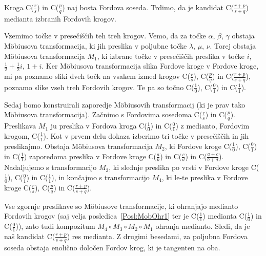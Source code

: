\documentclass[mat1]{fmfdelo}
\begin{document}
\begin{dokaz}
Kroga C($\frac{r}{s}$) in C($\frac{p}{q}$) naj bosta Fordova soseda. Trdimo, da je kandidat C($\frac{r+p}{s+q}$) medianta izbranih Fordovih krogov.

Vzemimo točke v presečiščih teh treh krogov. Vemo, da za točke $\alpha$, $\beta$, $\gamma$ obstaja M\"{o}biusova transformacija, ki jih preslika v poljubne točke $\lambda$, $\mu$, $\nu$. Torej obstaja M\"{o}biusova transformacija $M_{1}$, ki izbrane točke v presečiščih preslika v točke $i$, $\frac{1}{2}+\frac{1}{2}i$, $1+i$. Ker M\"{o}biusova transformacija slika Fordove kroge v Fordove kroge, mi pa poznamo sliki dveh točk na vsakem izmed krogov C($\frac{r}{s}$), C($\frac{p}{q}$) in C($\frac{r+p}{s+q}$), poznamo slike vseh treh Fordovih krogov. Te pa so točno C($\frac{1}{0}$), C($\frac{0}{1}$) in C($\frac{1}{1}$).

Sedaj bomo konstruirali zaporedje M\"{o}biusovih transformacij (ki je prav tako M\"{o}biusova transformacija). Začnimo s Fordovima sosedoma C($\frac{r}{s}$) in C($\frac{p}{q}$). Preslikava $M_{1}$ ju preslika v Fordova kroga C($\frac{1}{0}$) in C($\frac{0}{1}$) z medianto, Fordovim krogom, C($\frac{1}{1}$). Kot v prvem delu dokaza izberimo tri točke v presečiščih in jih preslikajmo. Obstaja M\"{o}biusova transformacija $M_{2}$, ki Fordove kroge C($\frac{1}{0}$), C($\frac{0}{1}$) in C($\frac{1}{1}$) zaporedoma preslika v Fordove kroge C($\frac{a}{b}$) in C($\frac{c}{d}$) in C($\frac{a+c}{b+d}$). Nadaljujemo s transformacijo $M_{3}$, ki slednje preslika po vrsti v Fordove kroge C($\frac{1}{0}$), C($\frac{0}{1}$) in C($\frac{1}{1}$), in končajmo s transformacijo $M_{4}$, ki le-te preslika v Fordove kroge C($\frac{r}{s}$), C($\frac{p}{q}$) in C($\frac{r+p}{s+q}$).

Vse zgornje preslikave so M\"{o}biusove transformacije, ki ohranjajo medianto Fordovih krogov (saj velja posledica~\ref{Posl:MobOhr1} ter je C($\frac{1}{1}$) medianta C($\frac{1}{0}$) in C($\frac{0}{1}$)), zato tudi kompozitum $M_{4} \circ M_{3} \circ M_{2} \circ M_{1}$ ohranja medianto. Sledi, da je naš kandidat C($\frac{r+p}{s+q}$) res medianta. Z drugimi besedami, za poljubna Fordova soseda obstaja enolično določen Fordov krog, ki je tangenten na oba.
\end{dokaz}

%
\end{document}
